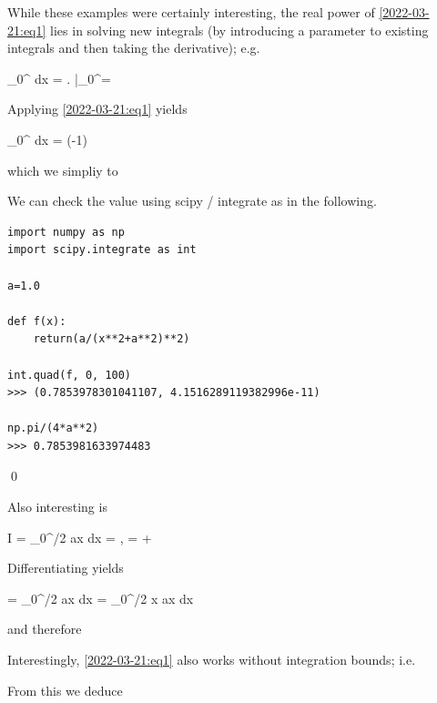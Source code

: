 While these examples were certainly interesting, the real power of \eqref{2022-03-21:eq1} lies in solving new integrals (by introducing a parameter to existing integrals and then taking the derivative); e.g.

\bee
\int_0^\infty {} dx =  \left. \arctan {} \right|_0^\infty = 
\eee

Applying \eqref{2022-03-21:eq1} yields

\bee
\int_0^\infty {} dx = (-1) 
\eee

which we simpliy to

\bee
{}
\eee

We can check the value using scipy / integrate as in the following.

\begin{verbatim}
import numpy as np
import scipy.integrate as int

a=1.0

def f(x):
    return(a/(x**2+a**2)**2)

int.quad(f, 0, 100)
>>> (0.7853978301041107, 4.1516289119382996e-11)
    
np.pi/(4*a**2)
>>> 0.7853981633974483
\end{verbatim}

\qed


Also interesting is

\bee
I = \int_0^{\pi/2} \sin ax dx = , \quad {} =  + 
\eee

Differentiating yields

\bee
{} = \int_0^{\pi/2} \sin ax dx = \int_0^{\pi/2} x \cos ax dx
\eee

and therefore

\bee
{}
\eee

Interestingly, \eqref{2022-03-21:eq1} also works without integration bounds; i.e.

\bee
{}
\eee

From this we deduce

\bee
{}
\eee

